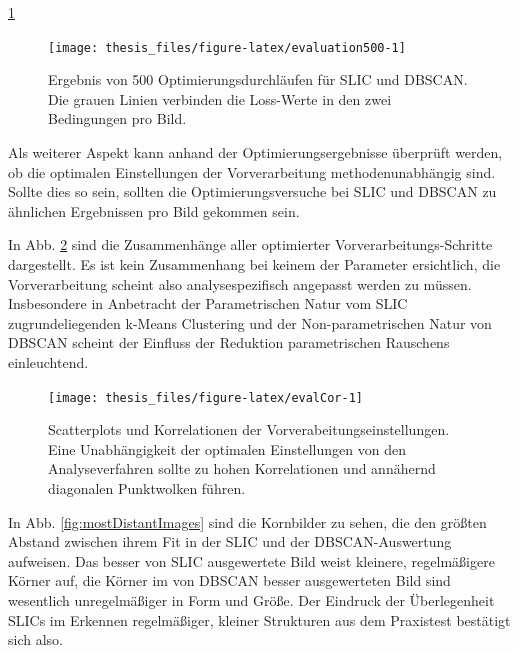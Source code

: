 \documentclass[
  12pt,
  openany]{book}
\begin{document}
\ref{fig:evaluation500}





\begin{figure}

{\centering \texttt{[image: thesis\_files/figure-latex/evaluation500-1]} 

}

\caption[Ergebnis von 500 Optimierungsdurchläufen für SLIC und DBSCAN.]{Ergebnis von 500 Optimierungsdurchläufen für SLIC und DBSCAN. Die grauen Linien verbinden die Loss-Werte in den zwei Bedingungen pro Bild.}\label{fig:evaluation500}
\end{figure}

Als weiterer Aspekt kann anhand der Optimierungsergebnisse überprüft werden, ob die optimalen Einstellungen der Vorverarbeitung methodenunabhängig sind. Sollte dies so sein, sollten die Optimierungsversuche bei SLIC und DBSCAN zu ähnlichen Ergebnissen pro Bild gekommen sein.

In Abb. \ref{fig:evalCor} sind die Zusammenhänge aller optimierter Vorverarbeitungs-Schritte dargestellt. Es ist kein Zusammenhang bei keinem der Parameter ersichtlich, die Vorverarbeitung scheint also analysespezifisch angepasst werden zu müssen. Insbesondere in Anbetracht der Parametrischen Natur vom SLIC zugrundeliegenden k-Means Clustering und der Non-parametrischen Natur von DBSCAN scheint der Einfluss der Reduktion parametrischen Rauschens einleuchtend.





\begin{figure}

{\centering \texttt{[image: thesis\_files/figure-latex/evalCor-1]} 

}

\caption[Scatterplots und Korrelationen der Vorverabeitungseinstellungen.]{Scatterplots und Korrelationen der Vorverabeitungseinstellungen. Eine Unabhängigkeit der optimalen Einstellungen von den Analyseverfahren sollte zu hohen Korrelationen und annähernd diagonalen Punktwolken führen.}\label{fig:evalCor}
\end{figure}

In Abb. \ref{fig:mostDistantImages} sind die Kornbilder zu sehen, die den größten Abstand zwischen ihrem Fit in der SLIC und der DBSCAN-Auswertung aufweisen. Das besser von SLIC ausgewertete Bild weist kleinere, regelmäßigere Körner auf, die Körner im von DBSCAN besser ausgewerteten Bild sind wesentlich unregelmäßiger in Form und Größe. Der Eindruck der Überlegenheit SLICs im Erkennen regelmäßiger, kleiner Strukturen aus dem Praxistest bestätigt sich also.
\end{document}
